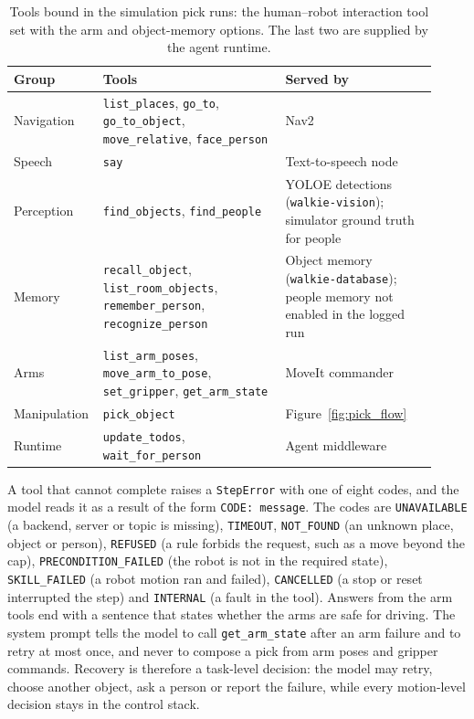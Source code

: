 \documentclass[12pt,a4paper]{article}
\begin{document}
\begin{table}[H]
    \centering
    \small
    \renewcommand{\arraystretch}{1.2}
    \begin{tabular}{@{}p{0.15\linewidth} p{0.42\linewidth} p{0.35\linewidth}@{}}
        \toprule
        Group & Tools & Served by \tabularnewline
        \midrule
        Navigation & \raggedright \texttt{list\_places}, \texttt{go\_to}, \texttt{go\_to\_object},
            \texttt{move\_relative}, \texttt{face\_person} & \raggedright Nav2 \tabularnewline
        Speech & \raggedright \texttt{say} & \raggedright Text-to-speech node \tabularnewline
        Perception & \raggedright \texttt{find\_objects}, \texttt{find\_people} & \raggedright YOLOE
            detections (\texttt{walkie-vision}); simulator ground truth for people \tabularnewline
        Memory & \raggedright \texttt{recall\_object}, \texttt{list\_room\_objects}, \texttt{remember\_person},
            \texttt{recognize\_person} & \raggedright Object memory (\texttt{walkie-database}); people memory
            not enabled in the logged run \tabularnewline
        Arms & \raggedright \texttt{list\_arm\_poses}, \texttt{move\_arm\_to\_pose}, \texttt{set\_gripper},
            \texttt{get\_arm\_state} & \raggedright MoveIt commander \tabularnewline
        Manipulation & \raggedright \texttt{pick\_object} & \raggedright Figure~\ref{fig:pick_flow}
            \tabularnewline
        Runtime & \raggedright \texttt{update\_todos}, \texttt{wait\_for\_person} & \raggedright Agent
            middleware \tabularnewline
        \bottomrule
    \end{tabular}
    \caption{\small{Tools bound in the simulation pick runs: the human--robot interaction tool set with the
    arm and object-memory options. The last two are supplied by the agent runtime.}}
    \label{tab:agent_tools}
\end{table}

A tool that cannot complete raises a \texttt{StepError} with one of eight codes, and the model reads it as
a result of the form \texttt{CODE: message}. The codes are \texttt{UNAVAILABLE} (a backend, server or
topic is missing), \texttt{TIMEOUT}, \texttt{NOT\_FOUND} (an unknown place, object or person),
\texttt{REFUSED} (a rule forbids the request, such as a move beyond the cap),
\texttt{PRECONDITION\_FAILED} (the robot is not in the required state), \texttt{SKILL\_FAILED} (a robot
motion ran and failed), \texttt{CANCELLED} (a stop or reset interrupted the step) and \texttt{INTERNAL}
(a fault in the tool). Answers from the arm tools end with a sentence that states whether the arms are
safe for driving. The system prompt tells the model to call \texttt{get\_arm\_state} after an arm
failure and to retry at most once, and never to compose a pick from arm poses and gripper commands.
Recovery is therefore a task-level decision: the model may retry, choose another object, ask a person or
report the failure, while every motion-level decision stays in the control stack.
\end{document}
